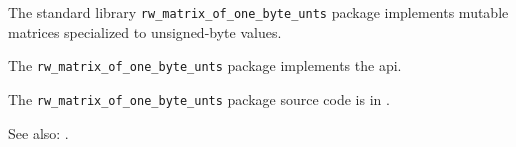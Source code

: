 
The standard library {\tt rw\_matrix\_of\_one\_byte\_unts} package implements mutable matrices specialized to unsigned-byte values.

The {\tt rw\_matrix\_of\_one\_byte\_unts} package implements the  api.

The {\tt rw\_matrix\_of\_one\_byte\_unts} package source code is in .

See also:  .


